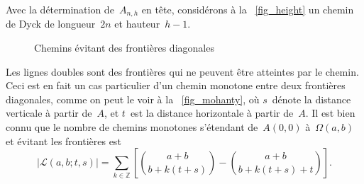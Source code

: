 Avec la détermination de~\(A_{n,h}\) en tête, considérons à la
\fig~\ref{fig_height} un chemin de Dyck de longueur~\(2n\) et
hauteur~\(h-1\).
\begin{figure}[!b]
\centering
{}
\quad
{}
\caption{Chemins évitant des frontières diagonales\label{fig_boundaries}}
\end{figure}
Les lignes doubles sont des frontières qui ne peuvent être atteintes
par le chemin. Ceci est en fait un cas particulier d'un chemin
monotone entre deux frontières diagonales, comme on peut le voir à la
\fig~\ref{fig_mohanty}, où \(s\)~dénote la distance verticale à partir
de~\(A\), et \(t\)~est la distance horizontale à partir de~\(A\). Il
est bien connu que le nombre de chemins monotones s'étendant
de~\(A(0,0)\) à~\(\Omega(a,b)\) et évitant les frontières est
\begin{equation}
\left\lvert\mathcal{L}(a,b;t,s)\right\rvert = \sum_{k \in \mathbb{Z}}\left[\binom{a+b}{b+k(t+s)} - \binom{a+b}{b+k(t+s)+t}\right].
\label{eq_mohanty}
\end{equation}

